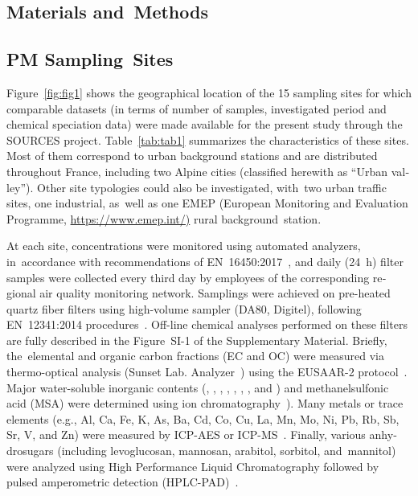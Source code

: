 \begin{otherlanguage}{english}
\section{Materials and~Methods}%
\label{sec:materials_and_methods}

\subsection{PM Sampling~Sites}%
\label{sub:pm_sampling_sites}

Figure~\ref{fig:fig1} shows the geographical location of the 15 sampling sites for which
comparable datasets (in terms of number of samples, investigated period and \PM{} chemical
speciation data) were made available for the present study through the SOURCES project.
Table~\ref{tab:tab1} summarizes the characteristics of these sites. Most of them
correspond to urban background stations and are distributed throughout France, including
two Alpine cities (classified herewith as ``Urban valley'').  Other site typologies could
also be investigated, with~two urban traffic sites, one industrial, as~well as one EMEP
(European Monitoring and Evaluation Programme, \url{https://www.emep.int/)} rural
background~station. 

At each site, \PM{} concentrations were monitored using automated analyzers, in~accordance
with recommendations of EN~16450:2017~\autocite{cenAmbient2017b}, and daily (\SI{24}{h})
filter samples were collected every third day by employees of the corresponding regional
air quality monitoring network. Samplings were achieved on pre-heated quartz fiber filters
using high-volume sampler (DA80, Digitel), following EN~12341:2014
procedures~\autocite{cenAmbient2014}. Off-line chemical analyses performed on these
filters are fully described in the Figure~SI-1 of the Supplementary Material. Briefly,
the~elemental and organic carbon fractions (EC and OC) were measured via thermo-optical
analysis (Sunset Lab. Analyzer~\autocite{birchElemental1996}) using the EUSAAR-2
protocol~\autocite{cavalliStandardised2010,cenAmbient2017a}.  Major water-soluble
inorganic contents (, , , , , ,
, and ) and methanelsulfonic acid (MSA) were determined using ion
chromatography~\autocite{jaffrezoSeasonal2005,cenAmbient2017a}). Many metals or trace
elements (e.g., Al, Ca, Fe, K, As, Ba, Cd, Co, Cu, La, Mn, Mo, Ni, Pb, Rb, Sb, Sr, V, and
Zn) were measured by ICP-AES or
ICP-MS~\autocite{allemanPM102010,mbengueSizedistributed2014,cenAmbient2005}.  Finally,
various anhydrosugars (including levoglucosan, mannosan, arabitol, sorbitol, and~mannitol)
were analyzed using High Performance Liquid Chromatography followed by pulsed amperometric
detection (HPLC-PAD)~\autocite{wakedSource2014}.


\end{otherlanguage}
